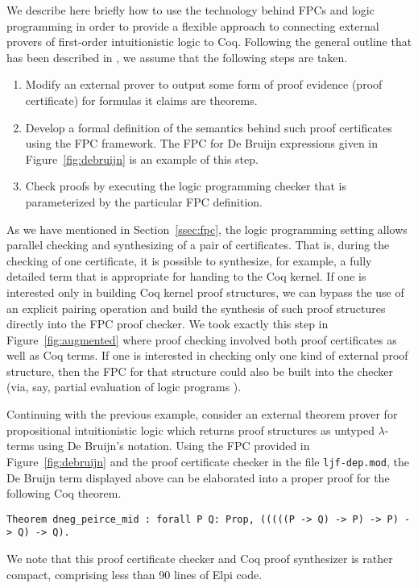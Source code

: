 We describe here briefly how to use the technology behind FPCs and
logic programming in order to provide a flexible approach to
connecting external provers of first-order intuitionistic logic to
Coq.  Following the general outline that has been described in
\cite{blanco17cade,blanco20coq}, we assume that the following steps are
taken.
\begin{enumerate}
\item Modify an external prover to output some form of proof evidence
  (proof certificate) for formulas it claims are theorems.

\item Develop a formal definition of the semantics behind such proof
  certificates using the FPC framework.  The FPC for De Bruijn
  expressions given in Figure~\ref{fig:debruijn} is an example of this
  step.

\item Check proofs by executing the logic programming checker that is
  parameterized by the particular FPC definition.
\end{enumerate}
As we have mentioned in Section~\ref{ssec:fpc}, the logic programming
setting allows parallel checking and synthesizing of a pair of
certificates.  That is, during the checking of one certificate, it is
possible to synthesize, for example, a fully detailed term that is
appropriate for handing to the Coq kernel.
If one is interested only in building Coq kernel proof structures, we
can bypass the use of an explicit pairing operation and build the
synthesis of such proof structures directly into the FPC proof
checker.  We took exactly this step in Figure~\ref{fig:augmented}
where proof checking involved both proof certificates as well as
Coq terms.  If one is interested in checking only one kind
of external proof structure, then the FPC for that structure could
also be built into the checker (via, say, partial evaluation of logic
programs \cite{lloyd91jlp}).

Continuing with the previous example, consider an external theorem
prover for propositional intuitionistic logic which returns proof
structures as untyped $\lambda$-terms using De Bruijn's notation.
Using the FPC provided in Figure~\ref{fig:debruijn} and the proof
certificate checker in the file \verb+ljf-dep.mod+,
the De Bruijn term
displayed above can be elaborated into a proper proof for the
following Coq theorem.

\begin{lstlisting}[basicstyle=\ttfamily,language=coq]
Theorem dneg_peirce_mid : forall P Q: Prop, (((((P -> Q) -> P) -> P) -> Q) -> Q).
\end{lstlisting}

We note that this proof certificate checker and Coq proof synthesizer
is rather compact, comprising less than 90 lines of Elpi code.



